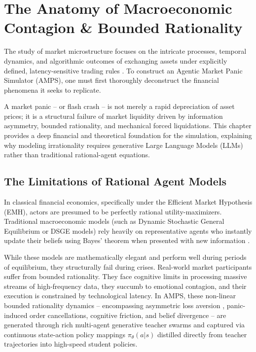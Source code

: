 \chapter{The Anatomy of Macroeconomic Contagion \& Bounded Rationality}
\label{ch:anatomy_panic}

The study of market microstructure focuses on the intricate processes, temporal dynamics, and algorithmic outcomes of exchanging assets under explicitly defined, latency-sensitive trading rules \cite{ohara1995market}. To construct an Agentic Market Panic Simulator (AMPS), one must first thoroughly deconstruct the financial phenomena it seeks to replicate. 

A market panic -- or flash crash -- is not merely a rapid depreciation of asset prices; it is a structural failure of market liquidity driven by information asymmetry, bounded rationality, and mechanical forced liquidations. This chapter provides a deep financial and theoretical foundation for the simulation, explaining why modeling irrationality requires generative Large Language Models (LLMs) rather than traditional rational-agent equations.

\section{The Limitations of Rational Agent Models}

In classical financial economics, specifically under the Efficient Market Hypothesis (EMH), actors are presumed to be perfectly rational utility-maximizers. Traditional macroeconomic models (such as Dynamic Stochastic General Equilibrium or DSGE models) rely heavily on representative agents who instantly update their beliefs using Bayes' theorem when presented with new information \cite{ohara1995market}.

While these models are mathematically elegant and perform well during periods of equilibrium, they structurally fail during crises. Real-world market participants suffer from bounded rationality. They face cognitive limits in processing massive streams of high-frequency data, they succumb to emotional contagion, and their execution is constrained by technological latency. In AMPS, these non-linear bounded rationality dynamics -- encompassing asymmetric loss aversion \cite{kahneman1979prospect}, panic-induced order cancellations, cognitive friction, and belief divergence -- are generated through rich multi-agent generative teacher swarms and captured via continuous state-action policy mappings $\pi_{\theta}(a|s)$ distilled directly from teacher trajectories into high-speed student policies.

